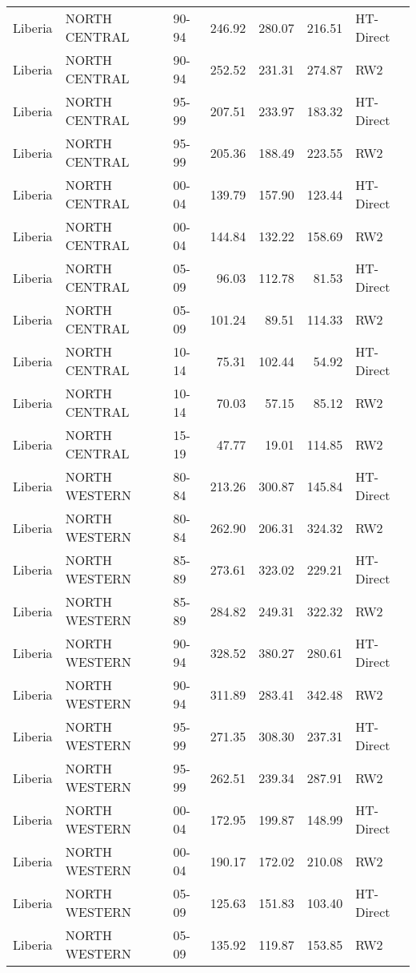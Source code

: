 \begin{longtable}{lllrrrl}
  Liberia & NORTH CENTRAL & 90-94 & 246.92 & 280.07 & 216.51 & HT-Direct \\ 
  Liberia & NORTH CENTRAL & 90-94 & 252.52 & 231.31 & 274.87 & RW2 \\ 
  Liberia & NORTH CENTRAL & 95-99 & 207.51 & 233.97 & 183.32 & HT-Direct \\ 
  Liberia & NORTH CENTRAL & 95-99 & 205.36 & 188.49 & 223.55 & RW2 \\ 
  Liberia & NORTH CENTRAL & 00-04 & 139.79 & 157.90 & 123.44 & HT-Direct \\ 
  Liberia & NORTH CENTRAL & 00-04 & 144.84 & 132.22 & 158.69 & RW2 \\ 
  Liberia & NORTH CENTRAL & 05-09 & 96.03 & 112.78 & 81.53 & HT-Direct \\ 
  Liberia & NORTH CENTRAL & 05-09 & 101.24 & 89.51 & 114.33 & RW2 \\ 
  Liberia & NORTH CENTRAL & 10-14 & 75.31 & 102.44 & 54.92 & HT-Direct \\ 
  Liberia & NORTH CENTRAL & 10-14 & 70.03 & 57.15 & 85.12 & RW2 \\ 
  Liberia & NORTH CENTRAL & 15-19 & 47.77 & 19.01 & 114.85 & RW2 \\ 
  Liberia & NORTH WESTERN & 80-84 & 213.26 & 300.87 & 145.84 & HT-Direct \\ 
  Liberia & NORTH WESTERN & 80-84 & 262.90 & 206.31 & 324.32 & RW2 \\ 
  Liberia & NORTH WESTERN & 85-89 & 273.61 & 323.02 & 229.21 & HT-Direct \\ 
  Liberia & NORTH WESTERN & 85-89 & 284.82 & 249.31 & 322.32 & RW2 \\ 
  Liberia & NORTH WESTERN & 90-94 & 328.52 & 380.27 & 280.61 & HT-Direct \\ 
  Liberia & NORTH WESTERN & 90-94 & 311.89 & 283.41 & 342.48 & RW2 \\ 
  Liberia & NORTH WESTERN & 95-99 & 271.35 & 308.30 & 237.31 & HT-Direct \\ 
  Liberia & NORTH WESTERN & 95-99 & 262.51 & 239.34 & 287.91 & RW2 \\ 
  Liberia & NORTH WESTERN & 00-04 & 172.95 & 199.87 & 148.99 & HT-Direct \\ 
  Liberia & NORTH WESTERN & 00-04 & 190.17 & 172.02 & 210.08 & RW2 \\ 
  Liberia & NORTH WESTERN & 05-09 & 125.63 & 151.83 & 103.40 & HT-Direct \\ 
  Liberia & NORTH WESTERN & 05-09 & 135.92 & 119.87 & 153.85 & RW2 \\ 

\end{longtable}
